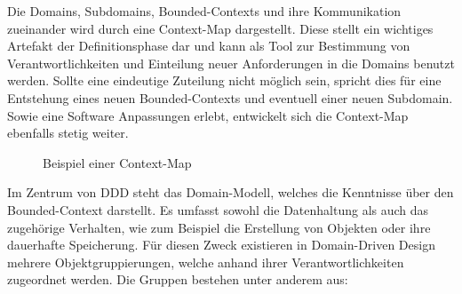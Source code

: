 Die  Domains, Subdomains, Bounded-Contexts und ihre Kommunikation zueinander wird durch eine Context-Map dargestellt. Diese stellt ein wichtiges Artefakt der Definitionsphase dar und kann als Tool zur Bestimmung von Verantwortlichkeiten und Einteilung neuer Anforderungen in die Domains benutzt werden. Sollte eine eindeutige Zuteilung nicht möglich sein, spricht dies für eine Entstehung eines neuen Bounded-Contexts und eventuell einer neuen Subdomain. Sowie eine Software Anpassungen erlebt, entwickelt sich die Context-Map ebenfalls stetig weiter. 

\begin{figure}[htbp]
	\centering
	
	\caption{\color{red} Beispiel einer Context-Map}
	\label{fig:Context-Map-Example}
\end{figure}

Im Zentrum von DDD steht das Domain-Modell, welches die Kenntnisse über den Bounded-Context darstellt. Es umfasst sowohl die Datenhaltung als auch das zugehörige Verhalten, wie zum Beispiel die Erstellung von Objekten oder ihre dauerhafte Speicherung. Für diesen Zweck existieren in Domain-Driven Design mehrere Objektgruppierungen, welche anhand ihrer Verantwortlichkeiten zugeordnet werden. Die Gruppen bestehen unter anderem aus:

